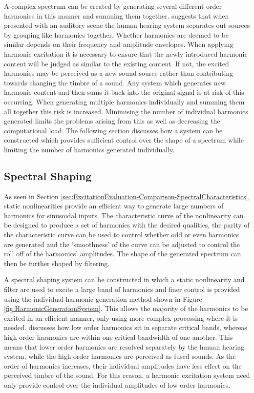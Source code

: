 		A complex spectrum can be created by generating several different order harmonics in this manner and
		summing them together. \citet{bregman1994auditory} suggests that when presented with an auditory scene the
		human hearing system separates out sources by grouping like harmonics together. Whether harmonics are
		deemed to be similar depends on their frequency and amplitude envelopes. When applying harmonic excitation
		it is necessary to ensure that the newly introduced harmonic content will be judged as similar to the
		existing content. If not, the excited harmonics may be perceived as a new sound source rather than
		contributing towards changing the timbre of a sound. Any system which generates new harmonic content and
		then sums it back into the original signal is at risk of this occurring. When generating multiple harmonics
		individually and summing them all together this risk is increased. Minimising the number of individual
		harmonics generated limits the problems arising from this as well as decreasing the computational load. The
		following section discusses how a system can be constructed which provides sufficient control over the
		shape of a spectrum while limiting the number of harmonics generated individually.
		
	\subsection{Spectral Shaping}
	\label{sec:FeatureControl-Systems-SpectralShaping}
		As seen in Section \ref{sec:ExcitationEvaluation-Comparison-SpectralCharacteristics}, static nonlinearities
		provide an efficient way to generate large numbers of harmonics for sinusoidal inputs. The characteristic
		curve of the nonlinearity can be designed to produce a set of harmonics with the desired qualities, the
		parity of the characteristic curve can be used to control whether odd or even harmonics are generated and
		the `smoothness' of the curve can be adjusted to control the roll off of the harmonics' amplitudes. The
		shape of the generated spectrum can then be further shaped by filtering.

		A spectral shaping system can be constructed in which a static nonlinearity and filter are used to excite a
		large band of harmonics and finer control is provided using the individual harmonic generation method shown
		in Figure \ref{fig:HarmonicGenerationSystem}. This allows the majority of the harmonics to be excited in
		an efficient manner, only using more complex processing where it is needed. \citet{howard2009acoustics}
		discusses how low order harmonics sit in separate critical bands, whereas high order harmonics are within
		one critical bandwidth of one another. This means that lower order harmonics are resolved separately by the
		human hearing system, while the high order harmonics are perceived as fused sounds. As the order of
		harmonics increases, their individual amplitudes have less effect on the perceived timbre of the sound. For
		this reason, a harmonic excitation system need only provide control over the individual amplitudes of low
		order harmonics. 

